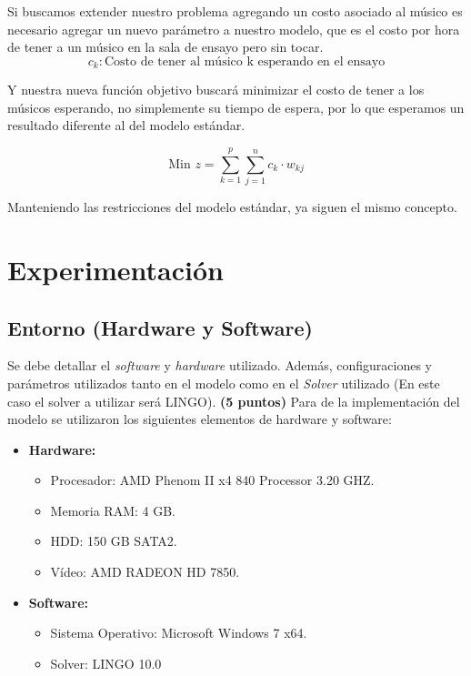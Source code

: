 \documentclass[journal, 10pt]{IEEEtran}
\begin{document}
Si buscamos extender nuestro problema agregando un costo asociado al músico es necesario agregar un nuevo parámetro a nuestro modelo, que es el costo por hora de tener a un músico en la sala de ensayo pero sin tocar.
	$$c_k : \text{Costo de tener al músico k esperando en el ensayo} $$
	
Y nuestra nueva función objetivo buscará minimizar el costo de tener a los músicos esperando, no simplemente su tiempo de espera, por lo que esperamos un resultado diferente al del modelo estándar.

\begin{equation} \label{eq:FO2}
\text{Min } z = \sum_{k=1}^{p}\sum_{j=1}^n c_{k} \cdot w_{kj} 
\end{equation}

Manteniendo las restricciones del modelo estándar, ya siguen el mismo concepto.

\section{Experimentación}
\subsection{Entorno (Hardware y Software)}
Se debe detallar el \textit{software} y \textit{hardware} utilizado. Además, configuraciones y parámetros utilizados tanto en el modelo como en el \textit{Solver} utilizado (En este caso el solver a utilizar será LINGO). \textbf{(5 puntos)}
Para de la implementación del modelo se utilizaron los siguientes elementos de hardware y software:
\begin{itemize}
	\item \textbf{Hardware:} 
		\begin{itemize}
			\item Procesador: AMD Phenom II x4 840 Processor 3.20 GHZ.
			\item Memoria RAM: 4 GB.
			\item HDD: 150 GB SATA2.	
			\item Vídeo: AMD RADEON HD 7850.
		\end{itemize}
	\item \textbf{Software:}
		\begin{itemize}
			\item Sistema Operativo: Microsoft Windows 7 x64.
			\item Solver: LINGO 10.0
		\end{itemize}
\end{itemize}
\end{document}
